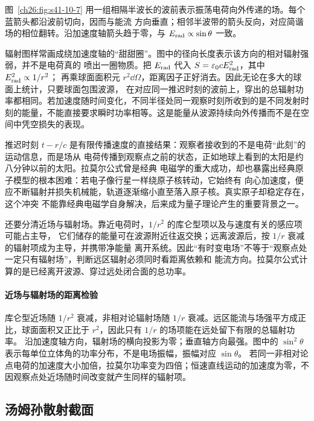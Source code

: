 {图~\ref{ch26:fig:s41-10-7} 用一组相隔半波长的波前表示振荡电荷向外传递的场。每个蓝箭头都沿波前切向，因而与能流
方向垂直；相邻半波带的箭头反向，对应简谐场的相位翻转。沿加速度轴箭头趋于零，与
$E_{\rm rad}\propto\sin\theta$ 一致。

\radiationWavefrontDiagram

辐射图样常画成绕加速度轴的“甜甜圈”。图中的径向长度表示该方向的相对辐射强弱，并不是电荷真的
喷出一圈物质。把 $E_{\rm rad}$ 代入 $S=\varepsilon_0cE_{\rm rad}^2$，其中 $E_{\rm rad}^2\propto1/r^2$；
再乘球面面积元 $r^2\dd\Omega$，距离因子正好消去。因此无论在多大的球面上统计，只要球面包围波源，
在对应同一推迟时刻的波前上，穿出的总辐射功率都相同。若加速度随时间变化，不同半径处同一观察时刻所收到的是不同发射时刻的能量，不能直接要求瞬时功率相等。这是能量从波源持续向外传播而不是在空间中凭空损失的表现。

推迟时刻 $t-r/c$ 是有限传播速度的直接结果：观察者接收到的不是电荷“此刻”的运动信息，而是场从
电荷传播到观察点之前的状态，正如地球上看到的太阳是约八分钟以前的太阳。拉莫尔公式曾是经典
电磁学的重大成功，却也暴露出经典原子模型的根本困难：若电子像行星一样绕原子核转动，它始终有
向心加速度，便应不断辐射并损失机械能，轨道逐渐缩小直至落入原子核。真实原子却稳定存在，这个冲突
不能靠经典电磁学自身解决，后来成为量子理论产生的重要背景之一。

还要分清近场与辐射场。靠近电荷时，$1/r^2$ 的库仑型项以及与速度有关的感应项可能占主导，
它们储存的能量可在波源附近往返交换；远离波源后，按 $1/r$ 衰减的辐射项成为主导，并携带净能量
离开系统。因此“有时变电场”不等于“观察点处一定只有辐射场”，判断远区辐射必须同时看距离依赖和
能流方向。拉莫尔公式计算的是已经离开波源、穿过远处闭合面的总功率。


\paragraph{近场与辐射场的距离检验}
库仑型近场随 $1/r^2$ 衰减，非相对论辐射场随 $1/r$ 衰减。远区能流与场强平方成正比，球面面积又正比于 $r^2$，因此只有 $1/r$ 的场项能在远处留下有限的总辐射功率。
沿加速度轴方向，辐射场的横向投影为零；垂直轴方向最强。图中的 $\sin^2\theta$ 表示每单位立体角的功率分布，不是电场振幅，振幅对应 $\sin\theta$。
若同一非相对论点电荷的加速度大小加倍，拉莫尔功率变为四倍；恒速直线运动的加速度为零，不因观察点处近场随时间改变就产生同样的辐射项。


\subsection{汤姆孙散射截面}


}
